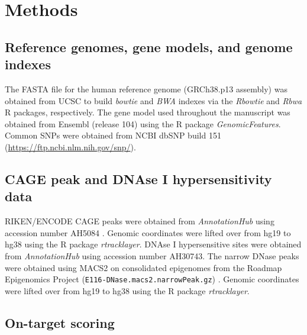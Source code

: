 \documentclass[pdftex,english,10pt]{article}
\begin{document}
 
\section{Methods}



\subsection*{Reference genomes, gene models, and genome indexes}

The FASTA file for the human reference genome (GRCh38.p13 assembly) was obtained from UCSC to build \textit{bowtie} and \textit{BWA} indexes via the \textit{Rbowtie} \citep{hahne2012rbowtie} and \textit{Rbwa} R packages, respectively. 
The gene model used throughout the manuscript was obtained from Ensembl (release 104) using the R package \textit{GenomicFeatures}.
Common SNPs were obtained from NCBI dbSNP build 151 (\url{https://ftp.ncbi.nlm.nih.gov/snp/}).

\subsection*{CAGE peak and DNAse I hypersensitivity data}

RIKEN/ENCODE CAGE peaks were obtained from \textit{AnnotationHub} using accession number AH5084 \citep{djebali2012landscape}. Genomic coordinates were lifted over from hg19 to hg38 using the R package \textit{rtracklayer}. DNAse I hypersensitive sites were obtained from \textit{AnnotationHub} using accession number AH30743. The narrow DNase peaks were obtained using MACS2 on consolidated epigenomes from the Roadmap Epigenomics Project (\texttt{E116-DNase.macs2.narrowPeak.gz}) \citep{kundaje2015integrative}. Genomic coordinates were lifted over from hg19 to hg38 using the R package \textit{rtracklayer}.


\subsection*{On-target scoring}
\end{document}
